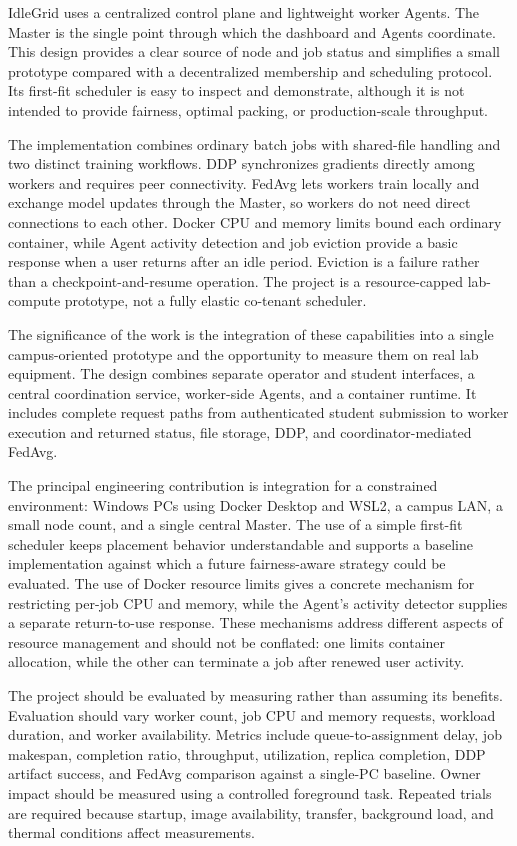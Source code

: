 \documentclass{article}
\begin{document}
IdleGrid uses a centralized control plane and lightweight worker Agents. The Master is the single point through which the dashboard and Agents coordinate. This design provides a clear source of node and job status and simplifies a small prototype compared with a decentralized membership and scheduling protocol. Its first-fit scheduler is easy to inspect and demonstrate, although it is not intended to provide fairness, optimal packing, or production-scale throughput.

The implementation combines ordinary batch jobs with shared-file handling and two distinct training workflows. DDP synchronizes gradients directly among workers and requires peer connectivity. FedAvg lets workers train locally and exchange model updates through the Master, so workers do not need direct connections to each other. Docker CPU and memory limits bound each ordinary container, while Agent activity detection and job eviction provide a basic response when a user returns after an idle period. Eviction is a failure rather than a checkpoint-and-resume operation. The project is a resource-capped lab-compute prototype, not a fully elastic co-tenant scheduler.

The significance of the work is the integration of these capabilities into a single campus-oriented prototype and the opportunity to measure them on real lab equipment. The design combines separate operator and student interfaces, a central coordination service, worker-side Agents, and a container runtime. It includes complete request paths from authenticated student submission to worker execution and returned status, file storage, DDP, and coordinator-mediated FedAvg.

The principal engineering contribution is integration for a constrained environment: Windows PCs using Docker Desktop and WSL2, a campus LAN, a small node count, and a single central Master. The use of a simple first-fit scheduler keeps placement behavior understandable and supports a baseline implementation against which a future fairness-aware strategy could be evaluated. The use of Docker resource limits gives a concrete mechanism for restricting per-job CPU and memory, while the Agent's activity detector supplies a separate return-to-use response. These mechanisms address different aspects of resource management and should not be conflated: one limits container allocation, while the other can terminate a job after renewed user activity.

The project should be evaluated by measuring rather than assuming its benefits. Evaluation should vary worker count, job CPU and memory requests, workload duration, and worker availability. Metrics include queue-to-assignment delay, job makespan, completion ratio, throughput, utilization, replica completion, DDP artifact success, and FedAvg comparison against a single-PC baseline. Owner impact should be measured using a controlled foreground task. Repeated trials are required because startup, image availability, transfer, background load, and thermal conditions affect measurements.
\end{document}
